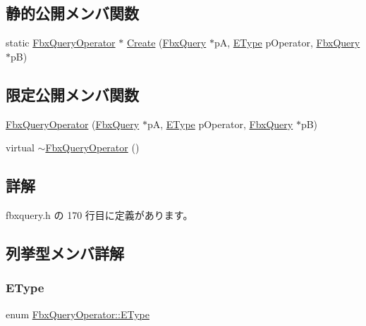 \subsection*{静的公開メンバ関数}
\begin{DoxyCompactItemize}
\item 
static \hyperlink{class_fbx_query_operator}{Fbx\+Query\+Operator} $\ast$ \hyperlink{class_fbx_query_operator_aa509a5fb63d706c86ec3bc530e21f272}{Create} (\hyperlink{class_fbx_query}{Fbx\+Query} $\ast$pA, \hyperlink{class_fbx_query_operator_aadf25d36a6eab339504a02ce57fd6ad4}{E\+Type} p\+Operator, \hyperlink{class_fbx_query}{Fbx\+Query} $\ast$pB)
\end{DoxyCompactItemize}
\subsection*{限定公開メンバ関数}
\begin{DoxyCompactItemize}
\item 
\hyperlink{class_fbx_query_operator_a8589182ef13c8a61ed084a632269eb48}{Fbx\+Query\+Operator} (\hyperlink{class_fbx_query}{Fbx\+Query} $\ast$pA, \hyperlink{class_fbx_query_operator_aadf25d36a6eab339504a02ce57fd6ad4}{E\+Type} p\+Operator, \hyperlink{class_fbx_query}{Fbx\+Query} $\ast$pB)
\item 
virtual \hyperlink{class_fbx_query_operator_a26d2716be424ac439ed6f1f3b4abf836}{$\sim$\+Fbx\+Query\+Operator} ()
\end{DoxyCompactItemize}


\subsection{詳解}


 fbxquery.\+h の 170 行目に定義があります。



\subsection{列挙型メンバ詳解}
\mbox{\label{class_fbx_query_operator_aadf25d36a6eab339504a02ce57fd6ad4}} 
\subsubsection{\texorpdfstring{E\+Type}{EType}}
{\footnotesize\ttfamily enum \hyperlink{class_fbx_query_operator_aadf25d36a6eab339504a02ce57fd6ad4}{Fbx\+Query\+Operator\+::\+E\+Type}}

